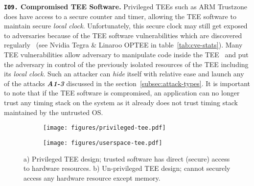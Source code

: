 \noindent\textbf{\texttt{I09.} Compromised TEE Software.}
Privileged TEEs such as ARM Trustzone does have access to a secure counter and timer, allowing the TEE software to maintain secure \textit{local clock}. Unfortunately, this secure clock may still get exposed to adversaries because of the TEE software vulnerabilities which are discovered regularly~\cite{sok-sgx-fail, sok-trustzone-cves} (see Nvidia Tegra \& Linaroo OPTEE in table~\ref{tab:cve-stats}). Many TEE vulnerabilities allow adversary to manipulate code inside the TEE~\cite{boomerang-trustzone} and put the adversary in control of the previously isolated resources of the TEE including its \textit{local clock}. Such an attacker can \textit{hide} itself with relative ease and launch any of the attacks \textbf{\textit{A1-3}} discussed in the section~\ref{subsec:attack-types}. It is important to note that if the TEE software is compromised, an application can no longer trust any timing stack on the system as it already does not trust timing stack maintained by the untrusted OS. 

\begin{figure}[t]
    \small
    \centering
    \begin{subfigure}[t]{0.225\columnwidth}
        \centering
        \texttt{[image: figures/privileged-tee.pdf]}
        \caption{}
        \label{fig:privileged-tee}
    \end{subfigure}
    \hspace{20pt}
    \begin{subfigure}[t]{0.215\columnwidth}
        \centering
        \texttt{[image: figures/userspace-tee.pdf]}
        \caption{}
        \label{fig:userspace-tee}
    \end{subfigure}
    \caption{a) Privileged TEE design; trusted software has direct (secure) access to hardware resources. b) Un-privileged TEE design; cannot securely access any hardware resource except memory.}
    \label{fig:tee-paradigms}
\end{figure}